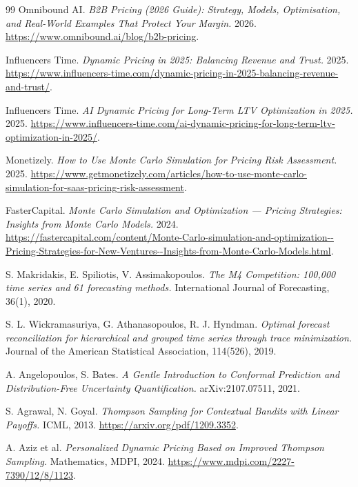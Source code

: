 \documentclass[11pt,a4paper]{article}
\begin{document}
\begin{thebibliography}{99}
Omnibound AI. \emph{B2B Pricing (2026 Guide): Strategy, Models, Optimisation, and Real-World Examples That Protect Your Margin.} 2026. \url{https://www.omnibound.ai/blog/b2b-pricing}.

Influencers Time. \emph{Dynamic Pricing in 2025: Balancing Revenue and Trust.} 2025. \url{https://www.influencers-time.com/dynamic-pricing-in-2025-balancing-revenue-and-trust/}.

Influencers Time. \emph{AI Dynamic Pricing for Long-Term LTV Optimization in 2025.} 2025. \url{https://www.influencers-time.com/ai-dynamic-pricing-for-long-term-ltv-optimization-in-2025/}.

Monetizely. \emph{How to Use Monte Carlo Simulation for Pricing Risk Assessment.} 2025. \url{https://www.getmonetizely.com/articles/how-to-use-monte-carlo-simulation-for-saas-pricing-risk-assessment}.

FasterCapital. \emph{Monte Carlo Simulation and Optimization --- Pricing Strategies: Insights from Monte Carlo Models.} 2024. \url{https://fastercapital.com/content/Monte-Carlo-simulation-and-optimization--Pricing-Strategies-for-New-Ventures--Insights-from-Monte-Carlo-Models.html}.

S. Makridakis, E. Spiliotis, V. Assimakopoulos. \emph{The M4 Competition: 100,000 time series and 61 forecasting methods.} International Journal of Forecasting, 36(1), 2020.

S. L. Wickramasuriya, G. Athanasopoulos, R. J. Hyndman. \emph{Optimal forecast reconciliation for hierarchical and grouped time series through trace minimization.} Journal of the American Statistical Association, 114(526), 2019.

A. Angelopoulos, S. Bates. \emph{A Gentle Introduction to Conformal Prediction and Distribution-Free Uncertainty Quantification.} arXiv:2107.07511, 2021.

S. Agrawal, N. Goyal. \emph{Thompson Sampling for Contextual Bandits with Linear Payoffs.} ICML, 2013. \url{https://arxiv.org/pdf/1209.3352}.

A. Aziz et al. \emph{Personalized Dynamic Pricing Based on Improved Thompson Sampling.} Mathematics, MDPI, 2024. \url{https://www.mdpi.com/2227-7390/12/8/1123}.


\end{thebibliography}
\end{document}
